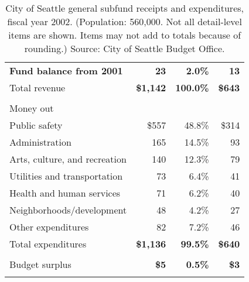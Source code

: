 \begin{table}[p]
\begin{center}
\begin{tabular}{lrrr}
\hspace{.1cm} \bf\small Fund balance from 2001 & \bf\small 23 & \bf\small 2.0\% & \bf\small 13 \\ %
\sc Total revenue & \bf \$1,142 & \bf 100.0\% & \bf \$643 \\%
& & & \\ %
\sc Money out & & & \\ %
\hspace{.1cm} Public safety & \$557 & 48.8\% & \$314 \\
\hspace{.1cm} Administration & 165 & 14.5\% & 93 \\
\hspace{.1cm} Arts, culture, and recreation & 140 & 12.3\% & 79 \\
\hspace{.1cm} Utilities and transportation & 73 & 6.4\% & 41 \\ %
\hspace{.1cm} Health and human services & 71 & 6.2\% & 40 \\
\hspace{.1cm} Neighborhoods/development & 48 & 4.2\% & 27 \\ %
\hspace{.1cm} Other expenditures & 82 & 7.2\% & 46 \\ %
\sc Total expenditures & \bf \$1,136 & \bf 99.5\% & \bf \$640 \\%
& & & \\ %
\sc Budget surplus & \bf \$5 & \bf 0.5\% & \bf \$3 \\
& & & \\ %
\end{tabular}
\caption[City of Seattle general subfund budget, fiscal year 2002.]{City of Seattle general subfund receipts and expenditures, fiscal year 2002. (Population: 560,000. Not all detail-level items are shown. Items may not add to totals because of rounding.) Source: City of Seattle Budget Office.}
\label{seattlebudget}
\end{center}
\end{table}









